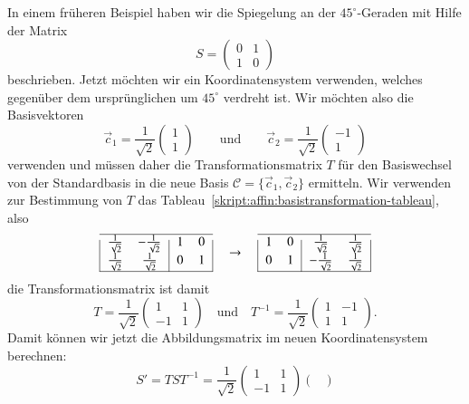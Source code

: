 \begin{beispiel}
In einem früheren Beispiel haben wir die Spiegelung an der $45^\circ$-Geraden
mit Hilfe der Matrix 
\[
S=\begin{pmatrix}0&1\\1&0\end{pmatrix}
\]
beschrieben.
Jetzt möchten wir ein Koordinatensystem verwenden, welches gegenüber
dem ursprünglichen um $45^\circ$ verdreht ist.
Wir möchten also die Basisvektoren
\[
\vec{c}_1 = \frac{1}{\sqrt{2}} \begin{pmatrix}1\\1\end{pmatrix}
\qquad\text{und}\qquad
\vec{c}_2 = \frac{1}{\sqrt{2}} \begin{pmatrix}-1\\1\end{pmatrix}
\]
verwenden und müssen daher die Transformationsmatrix $T$ für den
Basiswechsel von der Standardbasis in die neue Basis
$\mathcal{C}=\{\vec{c}_1,\vec{c}_2\}$ ermitteln.
Wir verwenden zur Bestimmung von $T$ das
Tableau~\eqref{skript:affin:basistransformation-tableau}, also
\[
\begin{tabular}{|>{$}c<{$}>{$}c<{$}|>{$}c<{$}>{$}c<{$}|}
\hline
\frac1{\sqrt{2}}&-\frac1{\sqrt{2}}&1&0\\
\frac1{\sqrt{2}}&\frac1{\sqrt{2}}&0&1\\
\hline
\end{tabular}
\quad
\rightarrow
\quad
\begin{tabular}{|>{$}c<{$}>{$}c<{$}|>{$}c<{$}>{$}c<{$}|}
\hline
1&0&\frac1{\sqrt{2}}&\frac1{\sqrt{2}}\\
0&1&-\frac1{\sqrt{2}}&\frac1{\sqrt{2}}\\
\hline
\end{tabular}
\]
die Transformationsmatrix ist damit
\[
T
=
\frac1{\sqrt{2}}\begin{pmatrix}
1&1\\
-1&1
\end{pmatrix}
\quad\text{und}\quad
T^{-1}
=
\frac1{\sqrt{2}}\begin{pmatrix}
1&-1\\
1&1
\end{pmatrix}.
\]
Damit können wir jetzt die Abbildungsmatrix im neuen Koordinatensystem
berechnen:
\[
S'
=
TST^{-1}
=
\frac1{\sqrt{2}}\begin{pmatrix}
1&1\\
-1&1
\end{pmatrix}
\begin{pmatrix}

\end{pmatrix}\]
\end{beispiel}
